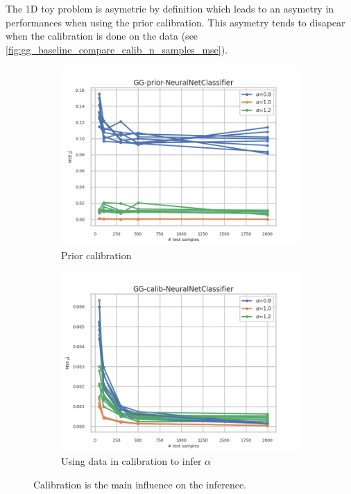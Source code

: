 The 1D toy problem is asymetric by definition which leads to an asymetry in performances when using the prior calibration.
This asymetry tends to disapear when the calibration is done on the data (see \autoref{fig:gg_baseline_compare_calib_n_samples_mse}).


\begin{figure}[ht!]
  \centering
  \begin{subfigure}[t]{0.49\linewidth}
    \includegraphics[width=\linewidth]{COMPARE/GG-prior/NeuralNetClassifier/profusion_n_samples_mse.png}
    \caption{Prior calibration}
  \end{subfigure}%
  \hfill
  \begin{subfigure}[t]{0.49\linewidth}
    \includegraphics[width=\linewidth]{COMPARE/GG-calib/NeuralNetClassifier/profusion_n_samples_mse.png}
    \caption{Using data in calibration to infer $\alpha$}
  \end{subfigure}
  \caption{Calibration is the main influence on the inference.}
  \label{fig:gg_baseline_compare_calib_n_samples_mse}
\end{figure}









